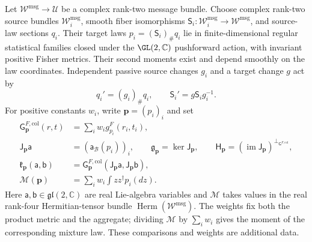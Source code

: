 Let \(\mathscr W^{\mathrm{msg}}\to\mathcal U\) be a complex rank-two message bundle. Choose
complex rank-two source bundles \(\mathscr W_i^{\mathrm{msg}}\), smooth fiber isomorphisms
\(\mathsf S_i:\mathscr W_i^{\mathrm{msg}}\to\mathscr W^{\mathrm{msg}}\), and source-law sections
\(q_i\). Their target laws \(p_i=(\mathsf S_i)_\#q_i\) lie in finite-dimensional regular statistical
families closed under the \(\GL(2,\mathbb C)\) pushforward action, with invariant positive Fisher
metrics. Their second moments exist and depend smoothly on the law coordinates. Independent
passive source changes \(g_i\) and a target change \(g\) act by
\begin{equation}
q_i'=(g_i)_\#q_i,\qquad \mathsf S_i'=g\mathsf S_i g_i^{-1}.
\label{eq:pb-collective-comparison-law}
\end{equation}
For positive constants \(w_i\), write \(\boldsymbol p=(p_i)_i\) and set
\begin{equation}
\begin{split}
\mathsf G^{F,\mathrm{col}}_{\boldsymbol p}(r,t)&=\sum_iw_i g^F_{p_i}(r_i,t_i),\\
\mathsf J_{\boldsymbol p}\mathsf a&=(\mathsf a_{\mathcal B}(p_i))_i,\qquad
\mathfrak g_{\boldsymbol p}=\ker\mathsf J_{\boldsymbol p},\qquad
\mathsf H_{\boldsymbol p}=(\operatorname{im}\mathsf J_{\boldsymbol p})^{\perp_{\mathsf G^{F,\mathrm{col}}}},\\
\mathfrak k_{\boldsymbol p}(\mathsf a,\mathsf b)
&=\mathsf G^{F,\mathrm{col}}_{\boldsymbol p}
(\mathsf J_{\boldsymbol p}\mathsf a,\mathsf J_{\boldsymbol p}\mathsf b),\\
\mathcal M(\boldsymbol p)&=\sum_iw_i\int zz^\dagger p_i(dz).
\end{split}
\label{eq:pb-collective-data}
\end{equation}
Here \(\mathsf a,\mathsf b\in\mathfrak{gl}(2,\mathbb C)\) are real Lie-algebra variables and
\(\mathcal M\) takes values in the real rank-four Hermitian-tensor bundle
\(\operatorname{Herm}(\mathscr W^{\mathrm{msg}})\). The weights fix both the product metric and
the aggregate; dividing \(\mathcal M\) by \(\sum_iw_i\) gives the moment of the corresponding
mixture law. These comparisons and weights are additional data.

